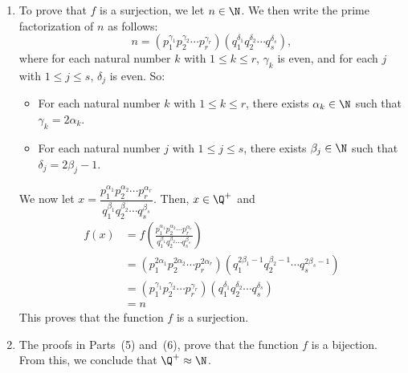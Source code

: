 \begin{enumerate}
\begin{enumerate}
\item To prove that $f$ is a surjection, we let $n \in \N$.  We then write the prime factorization of $n$ as follows:
\[
n = \left( p_1^{\gamma_1} p_2^{\gamma_2} \cdots p_r^{\gamma_r} \right) \left( q_1^{\delta_1} q_2^{\delta_2} \cdots q_s^{\delta_s} \right),
\]
where for each natural number $k$ with $1 \leq k \leq r$, $\gamma_k$ is even, and for each $j$ with $1 \leq j \leq s$, $\delta_j$ is even.  So:
\begin{itemize}
\item For each natural number $k$ with 
$1 \leq k \leq r$, there exists $\alpha_k \in \N$ such that $\gamma_k = 2 \alpha_k$.
\item For each natural number $j$ with 
$1 \leq j \leq s$, there exists $\beta_j \in \N$ such that $\delta_j = 2 \beta_j - 1$.
\end{itemize}

We now let $x = \dfrac{p_1^{\alpha_1} p_2^{\alpha_2} \cdots p_r^{\alpha_r}}{q_1^{\beta_1} q_2^{\beta_2} \cdots q_s^{\beta_s}}$.  Then, $x \in \Q^+$ and
\begin{align*}
f \left( x \right) &= f \left( \frac{p_1^{\alpha_1} p_2^{\alpha_2} \cdots p_r^{\alpha_r}}{q_1^{\beta_1} q_2^{\beta_2} \cdots q_s^{\beta_s}} \right) \\
                   &= \left( p_1^{2 \alpha_1} p_2^{2 \alpha_2} \cdots p_r^{2 \alpha_r} \right) \left( q_1^{2 \beta_1-1} q_2^{ \beta_2-1} \cdots q_s^{2 \beta_s-1} \right) \\
                   &= \left( p_1^{\gamma_1} p_2^{\gamma_2} \cdots p_r^{\gamma_r} \right) \left( q_1^{\delta_1} q_2^{\delta_2} \cdots q_s^{\delta_s} \right) \\
                   &= n
\end{align*}
This proves that the function $f$ is a surjection.


\item The proofs in Parts~(5) and~(6), prove that the function $f$ is a bijection.  From this, we conclude that $\Q^+ \approx \N$.

\end{enumerate}

\end{enumerate}

\hbreak
\endinput
